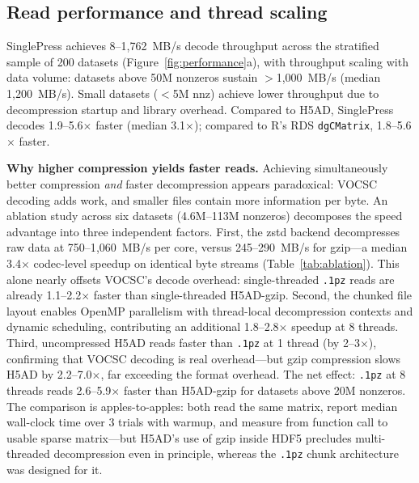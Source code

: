 \documentclass[10pt,twocolumn,letterpaper]{article}
\begin{document}
\subsection{Read performance and thread scaling}

SinglePress achieves 8--1{,}762~MB/s decode throughput across the stratified sample of 200 datasets (Figure~\ref{fig:performance}a), with throughput scaling with data volume: datasets above 50M nonzeros sustain $>$1{,}000~MB/s (median 1{,}200~MB/s).
Small datasets ($<$5M nnz) achieve lower throughput due to decompression startup and library overhead.
Compared to H5AD, SinglePress decodes 1.9--5.6$\times$ faster (median 3.1$\times$); compared to R's RDS \texttt{dgCMatrix}, 1.8--5.6$\times$ faster.

\textbf{Why higher compression yields faster reads.}
Achieving simultaneously better compression \emph{and} faster decompression appears paradoxical: VOCSC decoding adds work, and smaller files contain more information per byte.
An ablation study across six datasets (4.6M--113M nonzeros) decomposes the speed advantage into three independent factors.
First, the zstd backend decompresses raw data at 750--1{,}060~MB/s per core, versus 245--290~MB/s for gzip---a median 3.4$\times$ codec-level speedup on identical byte streams (Table~\ref{tab:ablation}).
This alone nearly offsets VOCSC's decode overhead: single-threaded \texttt{.1pz} reads are already 1.1--2.2$\times$ faster than single-threaded H5AD-gzip.
Second, the chunked file layout enables OpenMP parallelism with thread-local decompression contexts and dynamic scheduling, contributing an additional 1.8--2.8$\times$ speedup at 8 threads.
Third, uncompressed H5AD reads faster than \texttt{.1pz} at 1 thread (by 2--3$\times$), confirming that VOCSC decoding is real overhead---but gzip compression slows H5AD by 2.2--7.0$\times$, far exceeding the format overhead.
The net effect: \texttt{.1pz} at 8 threads reads 2.6--5.9$\times$ faster than H5AD-gzip for datasets above 20M nonzeros.
The comparison is apples-to-apples: both read the same matrix, report median wall-clock time over 3 trials with warmup, and measure from function call to usable sparse matrix---but H5AD's use of gzip inside HDF5 precludes multi-threaded decompression even in principle, whereas the \texttt{.1pz} chunk architecture was designed for it.
\end{document}
